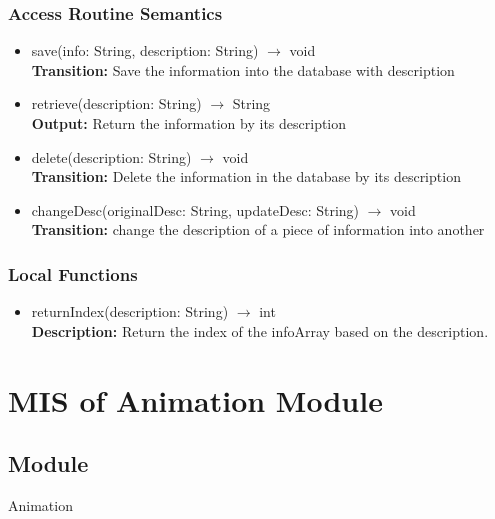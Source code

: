 \documentclass[12pt, titlepage]{article}
\begin{document}
\subsubsection{Access Routine Semantics}

\begin{itemize}
\item save(info: String, description: String) $\rightarrow$ void\\
\textbf{Transition:} Save the information into the database with description

\item retrieve(description: String) $\rightarrow$ String\\
\textbf{Output:} Return the information by its description

\item delete(description: String) $\rightarrow$ void\\
\textbf{Transition:} Delete the information in the database by its description

\item changeDesc(originalDesc: String, updateDesc: String) $\rightarrow$ void\\
\textbf{Transition:} change the description of a piece of information into another

\end{itemize}


\subsubsection{Local Functions}
\begin{itemize}
\item returnIndex(description: String) $\rightarrow$ int\\
\textbf{Description:} Return the index of the infoArray based on the description. 
\end{itemize}





\section{MIS of Animation Module} 
\label{AM}

\subsection{Module}
\hspace{1.5em}Animation
\end{document}
